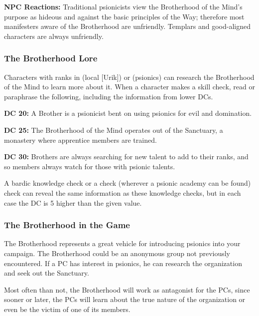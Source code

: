 \textbf{NPC Reactions:} Traditional psionicists view the Brotherhood of the Mind's purpose as hideous and against the basic principles of the Way; therefore most manifesters aware of the Brotherhood are unfriendly. Templars and good-aligned characters are always unfriendly.

\subsubsection{The Brotherhood Lore}
Characters with ranks in  (local [Urik]) or  (psionics) can research the Brotherhood of the Mind to learn more about it. When a character makes a skill check, read or paraphrase the following, including the information from lower DCs.

\textbf{DC 20:} A Brother is a psionicist bent on using psionics for evil and domination.

\textbf{DC 25:} The Brotherhood of the Mind operates out of the Sanctuary, a monastery where apprentice members are trained.

\textbf{DC 30:} Brothers are always searching for new talent to add to their ranks, and so members always watch for those with psionic talents.

A bardic knowledge check or a  check (wherever a psionic academy can be found) check can reveal the same information as these knowledge checks, but in each case the DC is 5 higher than the given value.


\subsubsection{The Brotherhood in the Game}
The Brotherhood represents a great vehicle for introducing psionics into your campaign. The Brotherhood could be an anonymous group not previously encountered. If a PC has interest in psionics, he can research the organization and seek out the Sanctuary.

Most often than not, the Brotherhood will work as antagonist for the PCs, since sooner or later, the PCs will learn about the true nature of the organization or even be the victim of one of its members.